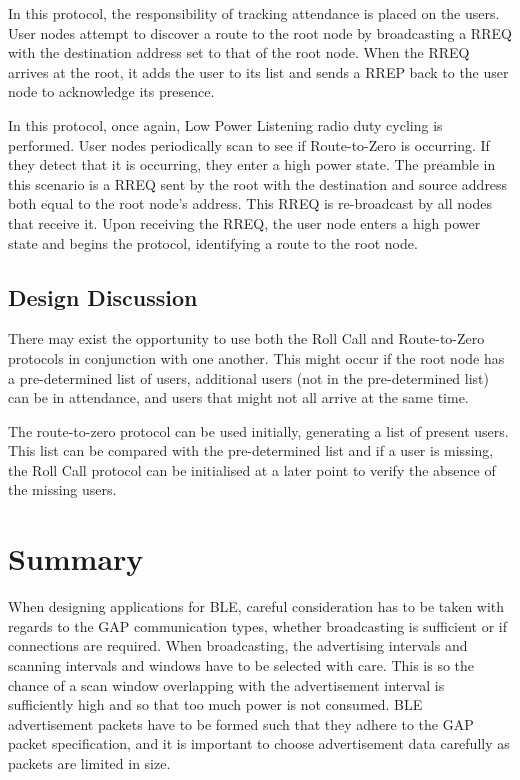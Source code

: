     In this protocol, the responsibility of tracking attendance is placed on the
    users. User nodes attempt to discover a route to the root node by broadcasting
    a RREQ with the destination address set to that of the root node. When the
    RREQ arrives at the root, it adds the user to its list and sends a RREP
    back to the user node to acknowledge its presence.

    In this protocol, once again, Low Power Listening radio duty cycling is performed.
    User nodes periodically scan to see if Route-to-Zero is occurring. If they
    detect that it is occurring, they enter a high power state. The preamble in
    this scenario is a RREQ sent by the root with the destination and source address
    both equal to the root node's address. This RREQ is re-broadcast by all nodes
    that receive it. Upon receiving the RREQ, the user node enters a high power
    state and begins the protocol, identifying a route to the root node.

    \subsection{Design Discussion}
    There may exist the opportunity to use both the Roll Call and Route-to-Zero
    protocols in conjunction with one another. This might occur if the root node
    has a pre-determined list of users, additional users (not in the pre-determined list)
    can be in attendance, and users that might not all arrive at the same time.

    The route-to-zero protocol can be used initially, generating a list of present
    users. This list can be compared with the pre-determined list and
    if a user is missing, the Roll Call protocol can be initialised at a later point
    to verify the absence of the missing users.

    \section{Summary}
    When designing applications for BLE, careful consideration has to be taken
    with regards to the GAP communication types, whether broadcasting is sufficient
    or if connections are required. When broadcasting, the advertising intervals
    and scanning intervals and windows have to be selected with care. This is so
    the chance of a scan window overlapping with the advertisement interval is sufficiently
    high and so that too much power is not consumed. BLE advertisement packets have to
    be formed such that they adhere to the GAP packet specification, and it is
    important to choose advertisement data carefully as packets are limited in size.

